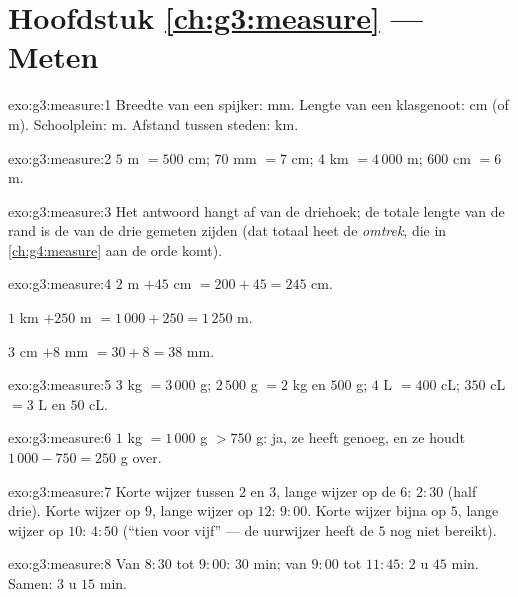 \section*{Hoofdstuk \ref{ch:g3:measure} --- Meten}

\begin{solution}{exo:g3:measure:1}
Breedte van een spijker: mm. Lengte van een klasgenoot: cm (of m).
Schoolplein: m. Afstand tussen steden: km.
\end{solution}

\begin{solution}{exo:g3:measure:2}
$5$ m $= 500$ cm; \quad $70$ mm $= 7$ cm; \quad
$4$ km $= 4\,000$ m; \quad $600$ cm $= 6$ m.
\end{solution}

\begin{solution}{exo:g3:measure:3}
Het antwoord hangt af van de driehoek; de totale lengte van de rand is de
 van de drie gemeten zijden (dat totaal heet de \emph{omtrek}, die in
\cref{ch:g4:measure} aan de orde komt).
\end{solution}

\begin{solution}{exo:g3:measure:4}
$2$ m $+ 45$ cm $= 200 + 45 = 245$ cm.

$1$ km $+ 250$ m $= 1\,000 + 250 = 1\,250$ m.

$3$ cm $+ 8$ mm $= 30 + 8 = 38$ mm.
\end{solution}

\begin{solution}{exo:g3:measure:5}
$3$ kg $= 3\,000$ g; \quad $2\,500$ g $= 2$ kg en $500$ g; \quad
$4$ L $= 400$ cL; \quad $350$ cL $= 3$ L en $50$ cL.
\end{solution}

\begin{solution}{exo:g3:measure:6}
$1$ kg $= 1\,000$ g $> 750$ g: ja, ze heeft genoeg, en ze houdt
$1\,000 - 750 = 250$ g over.
\end{solution}

\begin{solution}{exo:g3:measure:7}
Korte wijzer tussen $2$ en $3$, lange wijzer op de $6$: $2{:}30$ (half
drie). Korte wijzer op $9$, lange wijzer op $12$: $9{:}00$. Korte wijzer
bijna op $5$, lange wijzer op $10$: $4{:}50$ (``tien voor vijf'' --- de
uurwijzer heeft de $5$ nog niet bereikt).
\end{solution}

\begin{solution}{exo:g3:measure:8}
Van $8{:}30$ tot $9{:}00$: $30$ min; van $9{:}00$ tot $11{:}45$: $2$ u
$45$ min. Samen: $3$ u $15$ min.
\end{solution}


